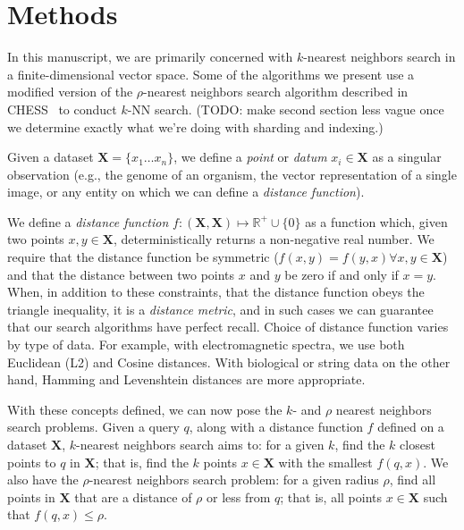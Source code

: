 \section{Methods}
\label{sec:methods}

In this manuscript, we are primarily concerned with $k$-nearest neighbors search in a finite-dimensional 
vector space. Some of the algorithms we present use a modified version of the $\rho$-nearest neighbors search 
algorithm described in CHESS~\cite{ishaq2019clustered} to conduct $k$-NN search. (TODO: make second section less 
vague once we determine exactly what we're doing with sharding and indexing.)

Given a dataset $\textbf{X} = \{x_1 \dots x_n\}$, we define a \emph{point} or \emph{datum} $x_i \in \textbf{X}$ as a singular observation (e.g., the genome of 
an organism, the vector representation of a single image, or any entity on which we can define a \emph{distance function}).

We define a \emph{distance function} $f : (\textbf{X}, \textbf{X}) \mapsto \mathbb{R}^+ \cup \{0\}$ as a function which, 
given two points $x, y \in \textbf{X}$, deterministically returns a non-negative real number. We require that the distance function 
be symmetric ($f(x, y) = f(y, x) \forall x, y \in \textbf{X}$) and that the distance between two points $x$ and $y$ be zero if and only if $x = y$. 
When, in addition to these constraints, that the distance function obeys
the triangle inequality, it is a \emph{distance metric}, and in such cases we can guarantee that our search algorithms have perfect recall. 
Choice of distance function varies by type of data. For example, with electromagnetic spectra, we use both 
Euclidean (L2) and Cosine distances. With biological or string data on the other hand, Hamming and Levenshtein distances are more appropriate.

With these concepts defined, we can now pose the $k$- and $\rho$ nearest neighbors search problems.
Given a query $q$, along with a distance function $f$ defined on a dataset $ \textbf{X}$, $k$-nearest neighbors search aims to: 
for a given $k$, find the $k$ closest points to $q$ in $ \textbf{X}$; that is, find the $k$ points $x \in \textbf{X}$ with the smallest $f(q, x)$.
We also have the $\rho$-nearest neighbors search problem: for a given radius $\rho$, find all points in $\textbf{X}$ that are a distance of $\rho$ 
or less from $q$; that is, all points $x \in \textbf{X}$ such that $f(q, x) \leq \rho$.

